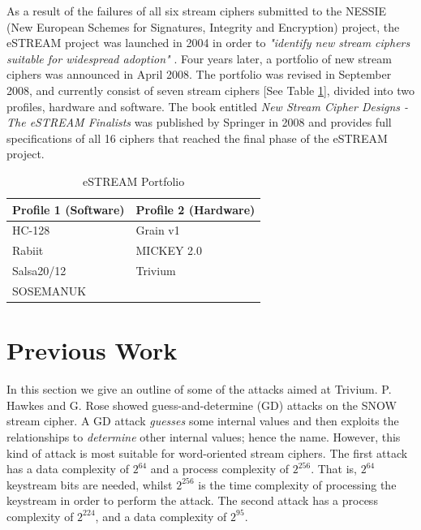 \documentclass[conference]{IEEEtran}
\begin{document}
As a result of the failures of all six stream ciphers submitted to the NESSIE (New European Schemes for Signatures, Integrity and Encryption) project, the eSTREAM project was launched in 2004 in order to \textit{"identify new stream ciphers suitable for widespread adoption"} \cite{call}. Four years later, a portfolio of new stream ciphers was announced in April 2008. The portfolio was revised in September 2008, and currently consist of seven stream ciphers [See Table \ref{tab:portfolio}], divided into two profiles, hardware and software. The book entitled \textit{New Stream Cipher Designs - The eSTREAM Finalists} \cite{book} was published by Springer in 2008 and provides full specifications of all 16 ciphers that reached the final phase of the eSTREAM project.
\begin{table}[H]
\centering
\begin{tabular}{|l|l|}\hline
Profile 1 (Software) & Profile 2 (Hardware)\\\hline
HC-128 & Grain v1\\
Rabiit & MICKEY 2.0\\
Salsa20/12 & Trivium\\
SOSEMANUK & \\\hline
\end{tabular}
\caption{eSTREAM Portfolio}
\label{tab:portfolio}
\end{table}

\section{Previous Work}\label{sec:previous-work}

In this section we give an outline of some of the attacks aimed at Trivium. 
P. Hawkes and G. Rose showed guess-and-determine (GD) attacks on the SNOW stream cipher. A GD attack \textit{guesses} some internal values and then exploits the relationships to \textit{determine} other internal values; hence the name. However, this kind of attack is most suitable for word-oriented stream ciphers. The first attack has a data complexity of $2^{64}$ and a process complexity of $2^{256}$. That is, $2^{64}$ keystream bits are needed, whilst $2^{256}$ is the time complexity of processing the keystream in order to perform the attack. The second attack has a process complexity of $2^{224}$, and a data complexity of $2^{95}$.\cite{Hawkes2003}
\end{document}
